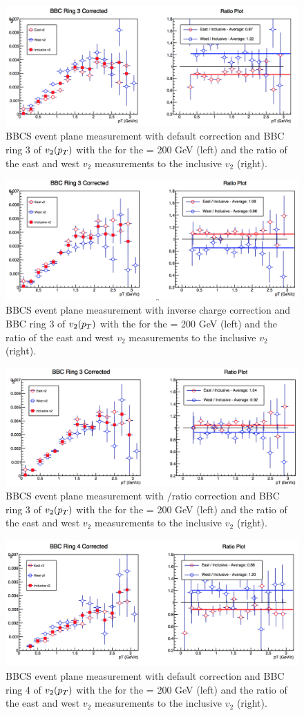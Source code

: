 \begin{figure}[!ht]
\centering
\includegraphics[width=0.65\linewidth]{figs/bbc_3_default.png}
\caption{BBCS event plane measurement with default correction and BBC ring 3 of $v_{2}(\mbox{$p_T$})$ with the  for the \pau \sqsn = 200 GeV (left) and the ratio of the east and west $v_2$ measurements to the inclusive $v_2$ (right).}
\end{figure}

\begin{figure}[!ht]
\centering
\includegraphics[width=0.65\linewidth]{figs/bbc_3_data.png}
\caption{BBCS event plane measurement with inverse charge correction and BBC ring 3 of $v_{2}(\mbox{$p_T$})$ with the  for the \pau \sqsn = 200 GeV (left) and the ratio of the east and west $v_2$ measurements to the inclusive $v_2$ (right).}
\end{figure}

\begin{figure}[!ht]
\centering
\includegraphics[width=0.65\linewidth]{figs/bbc_3_pp.png}
\caption{BBCS event plane measurement with \pp/\pau ratio correction and BBC ring 3 of $v_{2}(\mbox{$p_T$})$ with the  for the \pau \sqsn = 200 GeV (left) and the ratio of the east and west $v_2$ measurements to the inclusive $v_2$ (right).}
\end{figure}

\begin{figure}[!ht]
\centering
\includegraphics[width=0.65\linewidth]{figs/bbc_4_default.png}
\caption{BBCS event plane measurement with default correction and BBC ring 4 of $v_{2}(\mbox{$p_T$})$ with the  for the \pau \sqsn = 200 GeV (left) and the ratio of the east and west $v_2$ measurements to the inclusive $v_2$ (right).}
\end{figure}

